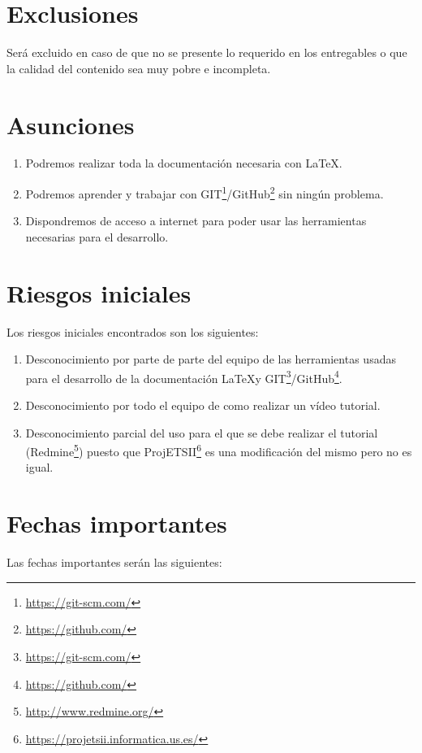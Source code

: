 \documentclass[a4paper,10pt]{scrartcl}
\begin{document}
\section{Exclusiones}
Será excluido en caso de que no se presente lo requerido en los entregables o que la calidad del contenido sea muy pobre e incompleta.


\section{Asunciones}

	\begin{enumerate}
		\item Podremos realizar toda la documentación necesaria con \LaTeX.
		\item Podremos aprender y trabajar con GIT\footnote{\url{https://git-scm.com/}}/GitHub\footnote{\url{https://github.com/}} sin ningún problema.
		\item Dispondremos de acceso a internet para poder usar las herramientas necesarias para el desarrollo.
	\end{enumerate}

\section{Riesgos iniciales}

Los riesgos iniciales encontrados son los siguientes:
\begin{enumerate}
	\item Desconocimiento por parte de parte del equipo de las herramientas usadas para el desarrollo de la documentación \LaTeX y GIT\footnote{\url{https://git-scm.com/}}/GitHub\footnote{\url{https://github.com/}}.
	
	\item Desconocimiento por todo el equipo de como realizar un vídeo tutorial.
	
	\item Desconocimiento parcial del uso para el que se debe realizar el tutorial (Redmine\footnote{\url{http://www.redmine.org/}}) puesto que ProjETSII\footnote{\url{https://projetsii.informatica.us.es/}} es una modificación del mismo pero no es igual.
\end{enumerate}


\section{Fechas importantes}
Las fechas importantes serán las siguientes:
\end{document}
